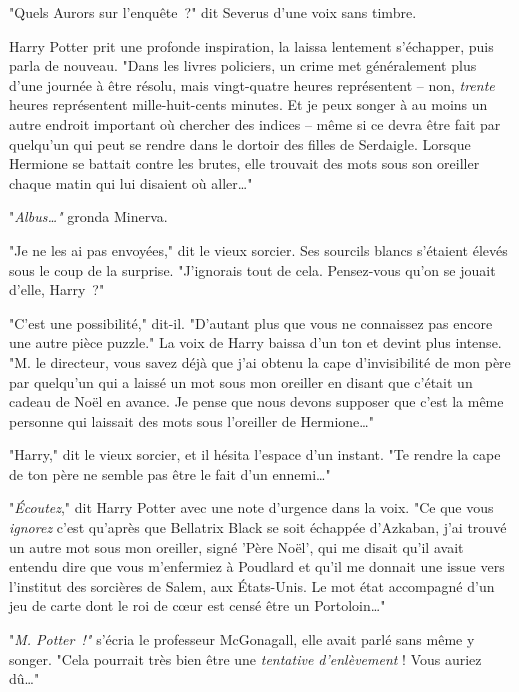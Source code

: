"Quels Aurors sur l'enquête~?" dit Severus d'une voix sans timbre.

Harry Potter prit une profonde inspiration, la laissa lentement s'échapper, puis parla de nouveau. "Dans les livres policiers, un crime met généralement plus d'une journée à être résolu, mais vingt-quatre heures représentent -- non, \emph{trente} heures représentent mille-huit-cents minutes. Et je peux songer à au moins un autre endroit important où chercher des indices -- même si ce devra être fait par quelqu'un qui peut se rendre dans le dortoir des filles de Serdaigle. Lorsque Hermione se battait contre les brutes, elle trouvait des mots sous son oreiller chaque matin qui lui disaient où aller…"

"\emph{Albus…"} gronda Minerva.

"Je ne les ai pas envoyées," dit le vieux sorcier. Ses sourcils blancs s'étaient élevés sous le coup de la surprise. "J'ignorais tout de cela. Pensez-vous qu'on se jouait d'elle, Harry~?"

"C'est une possibilité," dit-il. "D'autant plus que vous ne connaissez pas encore une autre pièce puzzle." La voix de Harry baissa d'un ton et devint plus intense. "M. le directeur, vous savez déjà que j'ai obtenu la cape d'invisibilité de mon père par quelqu'un qui a laissé un mot sous mon oreiller en disant que c'était un cadeau de Noël en avance. Je pense que nous devons supposer que c'est la même personne qui laissait des mots sous l'oreiller de Hermione…"

"Harry," dit le vieux sorcier, et il hésita l'espace d'un instant. "Te rendre la cape de ton père ne semble pas être le fait d'un ennemi…"

"\emph{Écoutez}," dit Harry Potter avec une note d'urgence dans la voix. "Ce que vous \emph{ignorez} c'est qu'après que Bellatrix Black se soit échappée d'Azkaban, j'ai trouvé un autre mot sous mon oreiller, signé 'Père Noël', qui me disait qu'il avait entendu dire que vous m'enfermiez à Poudlard et qu'il me donnait une issue vers l'institut des sorcières de Salem, aux États-Unis. Le mot état accompagné d'un jeu de carte dont le roi de cœur est censé être un Portoloin…"

"\emph{M. Potter~!"} s'écria le professeur McGonagall, elle avait parlé sans même y songer. "Cela pourrait très bien être une \emph{tentative d'enlèvement} ! Vous auriez dû…"

